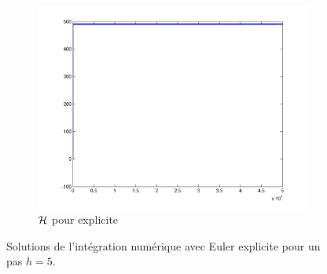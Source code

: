 \begin{figure}
  ~
  \begin{subfigure}[b]{0.3\textwidth}
    \includegraphics[width=\textwidth]{images/Q1_explicite_rate_H.png}
    \caption{$\mathcal{H}$ pour explicite}
    \label{fig:q1_explicite_H}
  \end{subfigure}
\caption{Solutions de l'intégration numérique avec Euler explicite pour un pas $h=5$.}
\label{fig_rater}
\end{figure}

